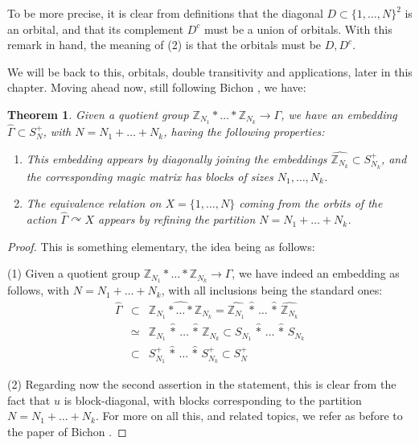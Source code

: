 \documentclass[12pt]{amsbook}
\newtheorem{theorem}{Theorem}[chapter]
\begin{document}
To be more precise, it is clear from definitions that the diagonal $D\subset\{1,\ldots,N\}^2$ is an orbital, and that its complement $D^c$ must be a union of orbitals. With this remark in hand, the meaning of (2) is that the orbitals must be $D,D^c$. 

\bigskip

We will be back to this, orbitals, double transitivity and applications, later in this chapter. Moving ahead now, still following Bichon \cite{bi4}, we have:

\begin{theorem}
Given a quotient group $\mathbb Z_{N_1}*\ldots*\mathbb Z_{N_k}\to\Gamma$, we have an embedding $\widehat{\Gamma}\subset S_N^+$, with $N=N_1+\ldots+N_k$, having the following properties:
\begin{enumerate}
\item This embedding appears by diagonally joining the embeddings $\widehat{\mathbb Z_{N_k}}\subset S_{N_k}^+$, and the corresponding magic matrix has blocks of sizes $N_1,\ldots,N_k$.

\item The equivalence relation on $X=\{1,\ldots,N\}$ coming from the orbits of the action $\widehat{\Gamma}\curvearrowright X$ appears by refining the partition $N=N_1+\ldots+N_k$.
\end{enumerate}
\end{theorem}

\begin{proof}
This is something elementary, the idea being as follows:

\medskip

(1) Given a quotient group $\mathbb Z_{N_1}*\ldots*\mathbb Z_{N_k}\to\Gamma$, we have indeed an embedding as follows, with $N=N_1+\ldots+N_k$, with all inclusions being the standard ones:
\begin{eqnarray*}
\widehat{\Gamma}
&\subset&\widehat{\mathbb Z_{N_1}*\ldots*\mathbb Z_{N_k}}
=\widehat{\mathbb Z_{N_1}}\,\hat{*}\,\ldots\,\hat{*}\,\widehat{\mathbb Z_{N_k}}\\
&\simeq&\mathbb Z_{N_1}\,\hat{*}\,\ldots\,\hat{*}\,\mathbb Z_{N_k}
\subset S_{N_1}\,\hat{*}\,\ldots\,\hat{*}\,S_{N_k}\\
&\subset&S_{N_1}^+\,\hat{*}\,\ldots\,\hat{*}\,S_{N_k}^+
\subset S_N^+
\end{eqnarray*}

(2) Regarding now the second assertion in the statement, this is clear from the fact that $u$ is block-diagonal, with blocks corresponding to the partition $N=N_1+\ldots+N_k$. For more on all this, and related topics, we refer as before to the paper of Bichon \cite{bi4}.
\end{proof}
\end{document}

